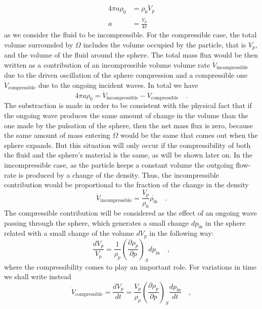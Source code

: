 \begin{align}
    4\pi a\rho_0 &= \rho_0\dot V_p \nonumber\\
    a &= \frac{\dot V_p}{4\pi}
\end{align}
as we consider the fluid to be incompressible. For the compressible case, the total volume surrounded by $\Omega$ includes the volume occupied by the particle, that is $V_p$, and the volume of the fluid around the sphere. The total mass flux would be then written as a contribution of an incompressible volume volume rate $\dot{V}_{\text{incompressible}}$ due to the driven oscillation of the sphere compression and a compressible one $\dot{V}_{\text{compressible}}$ due to the ongoing incident waves. In total we have
\begin{equation}\label{intro.arf.eq:4piarho_Vin-Vcomp}
    4\pi a \rho_0 = \dot{V}_{\text{incompressible}} - \dot{V}_{\text{compressible}}\quad.
\end{equation}
The substraction is made in order to be consistent with the physical fact that if the ongoing wave produces the same amount of change in the volume than the one made by the pulsation of the sphere, then the net mass flux is zero, because the same amount of mass entering $\Omega$ would be the same that comes out when the sphere expands. But this situation will only occur if the compressibility of both the fluid and the sphere's material is the same, as will be shown later on. In the imcompressible case, as the particle keeps a constant volume the outgoing flow-rate is produced by a change of the density. Thus, the incompressible contribution would be proportional to the fraction of the change in the density
\begin{equation}\label{intro.arf.eq:V_incomp}
    \dot{V}_{\text{incompressible}} = \frac{V_p}{\rho_0}\dot{\rho_{\text{in}}}\quad.
\end{equation}
The compressible contribution will be considered as the effect of an ongoing wave passing through the sphere, which generates a small change $d p_{\text{in}}$ in the sphere related with a small change of the volume $dV_p$ in the following way:
\begin{equation}
    \frac{dV_p}{V_p} = \frac{1}{\rho_p}\left(\frac{\partial\rho_p}{\partial p}\right)_S dp_{\text{in}}\quad,
\end{equation}
where the compressibility comes to play an important role. For variations in time we shall write instead
\begin{equation}
     \dot{V}_{\text{compressible}} = \frac{dV_p}{dt} = \frac{V_p}{\rho_p}\left(\frac{\partial\rho_p}{\partial p}\right)_S \frac{dp_{\text{in}}}{dt}\quad,
\end{equation}
